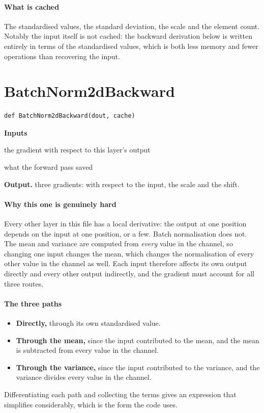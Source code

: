 \paragraph{What is cached}
The standardised values, the standard deviation, the scale and the element count. Notably the input itself is not cached: the backward derivation below is written entirely in terms of the standardised values, which is both less memory and fewer operations than recovering the input.


\section{BatchNorm2dBackward}
\begin{lstlisting}[style=sig]
def BatchNorm2dBackward(dout, cache)
\end{lstlisting}

\noindent\textbf{Inputs}
\begin{description}[leftmargin=2.2em,style=nextline,font=\normalfont\ttfamily]\setlength\itemsep{1pt}
  \item[{dout}] \normalfont the gradient with respect to this layer's output
  \item[{cache}] \normalfont what the forward pass saved
\end{description}

\noindent\textbf{Output.} three gradients: with respect to the input, the scale and the shift.


\paragraph{Why this one is genuinely hard}
Every other layer in this file has a local derivative: the output at one position depends on the input at one position, or a few. Batch normalisation does not. The mean and variance are computed from \emph{every} value in the channel, so changing one input changes the mean, which changes the normalisation of every other value in the channel as well. Each input therefore affects its own output directly and every other output indirectly, and the gradient must account for all three routes.


\paragraph{The three paths}

\begin{itemize}\setlength\itemsep{0pt}
  \item \textbf{Directly,} through its own standardised value.
  \item \textbf{Through the mean,} since the input contributed to the mean, and the mean is subtracted from every value in the channel.
  \item \textbf{Through the variance,} since the input contributed to the variance, and the variance divides every value in the channel.
\end{itemize}
Differentiating each path and collecting the terms gives an expression that simplifies considerably, which is the form the code uses.


